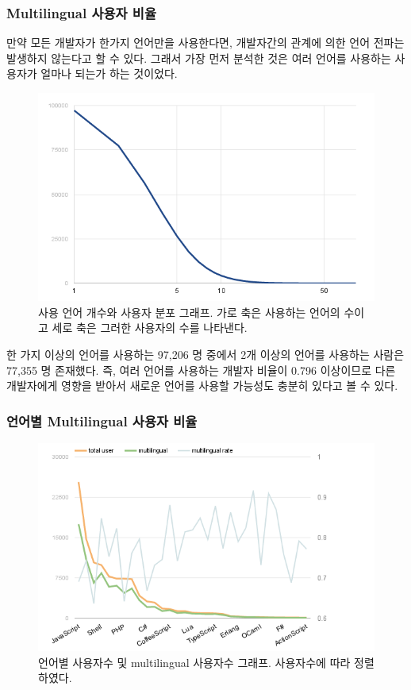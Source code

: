 \documentclass[10pt, a4paper, titlepage]{article}
\begin{document}
\subsubsection{Multilingual 사용자 비율}

만약 모든 개발자가 한가지 언어만을 사용한다면, 개발자간의 관계에 의한 언어 전파는 발생하지 않는다고 할 수 있다. 그래서 가장 먼저 분석한 것은 여러 언어를 사용하는 사용자가 얼마나 되는가 하는 것이었다.

\begin{figure}
\includegraphics[width=\textwidth]{image10}
\caption{사용 언어 개수와 사용자 분포 그래프. 가로 축은 사용하는 언어의 수이고 세로 축은 그러한 사용자의 수를 나타낸다.}
\label{fig:langnum}
\end{figure}

한 가지 이상의 언어를 사용하는 97,206 명 중에서 2개 이상의 언어를 사용하는 사람은 77,355 명 존재했다. 즉, 여러 언어를 사용하는 개발자 비율이 0.796 이상이므로 다른 개발자에게 영향을 받아서 새로운 언어를 사용할 가능성도 충분히 있다고 볼 수 있다.


\subsubsection{언어별 Multilingual 사용자 비율}

\begin{figure}[ht]
\includegraphics[width=\textwidth]{image04}
\caption{언어별 사용자수 및 multilingual 사용자수 그래프. 사용자수에 따라 정렬하였다.}
\label{fig:multilingual}
\end{figure}
\end{document}
